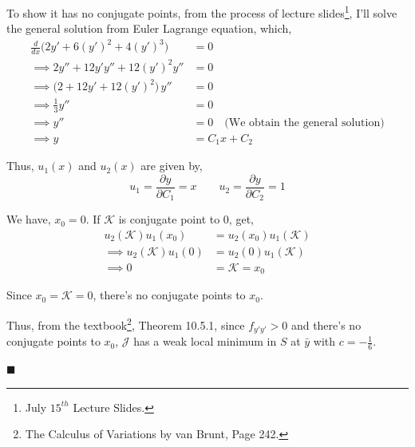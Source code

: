\documentclass[12pt]{article}
\begin{document}
To show it has no conjugate points, from the process of lecture slides\footnote{July $15^{th}$ Lecture Slides.}, I'll solve the general solution from Euler Lagrange equation, which, 
\begin{align*}
	\frac{d}{dx} \bigl( 2y' + 6(y')^2 + 4(y')^3 \bigr) &= 0 \\
	\implies 2y'' + 12y'y'' + 12(y')^2y'' &= 0 \\
	\implies \bigl(2 + 12y' + 12(y')^2\bigr)\,y'' &= 0 \\
	\implies \frac{1}{3}y'' &= 0\\
	\implies y'' &= 0 \quad \text{(We obtain the general solution)}\\
	\implies y &= C_1x + C_2 
\end{align*}

Thus, $u_1(x)$ and $u_2(x)$ are given by, 
$$u_1 = \frac{\partial y}{\partial C_1} = x \quad \quad u_2 = \frac{\partial y}{\partial C_2} = 1$$

We have, $x_0 = 0$. If $\mathcal K$ is conjugate point to 0, get, 
\begin{align*}
	u_2(\mathcal K)u_1(x_0) &= u_2(x_0)u_1(\mathcal K) \\
	\implies u_2(\mathcal K)u_1(0) &= u_2(0)u_1(\mathcal K) \\
	\implies 0 &= \mathcal K = x_0
\end{align*}

Since $x_0 = \mathcal K = 0$, there's no conjugate points to $x_0$.

Thus, from the textbook\footnote{The Calculus of Variations by van Brunt, Page 242.}, Theorem 10.5.1, since $f_{y'y'} > 0$ and there's no conjugate points to $x_0$, $\mathcal J$ has a weak local minimum in $S$ at $\bar y$ with $c = -\frac{1}{6}$.

\hfill $\blacksquare$

\end{document}
